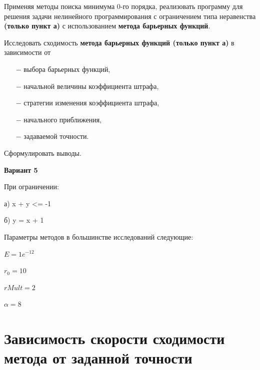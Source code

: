 \documentclass[12pt, a4paper]{article}
\begin{document}
Применяя методы поиска минимума 0-го порядка, реализовать программу для решения задачи нелинейного программирования с ограничением типа неравенства {\bf (только пункт а)} с использованием {\bf метода барьерных функций}.

Исследовать сходимость {\bf метода барьерных функций (только пункт а)} в зависимости от

\begin{itemize}
	\item[$-$]выбора барьерных функций,
	\item[$-$]начальной величины коэффициента штрафа,
	\item[$-$]стратегии изменения коэффициента штрафа,
	\item[$-$]начального приближения,
	\item[$-$]задаваемой точности.
\end{itemize}

Сформулировать выводы.

{\bf Вариант 5}

При ограничении:

а) x + y <= -1

б) y = x + 1

Параметры методов в большинстве исследований следующие:
\begin{trivlist}
	\item $ E = 1e^{-12} $
	\item $ r_0 = 10 $
	\item $ rMult = 2 $
	\item $ \alpha = 8 $
\end{trivlist}




\section{Зависимость скорости сходимости метода от заданной точности}
\end{document}
